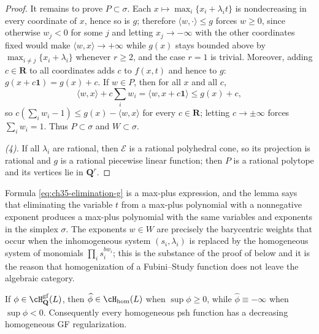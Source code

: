 \begin{proof}
It remains to prove $P\subset\sigma$.  Each $x\mapsto\max_i\{x_i+\lambda_it\}$
is nondecreasing in every coordinate of $x$, hence so is $g$; therefore
$\langle w,\cdot\rangle\leq g$ forces $w\geq0$, since otherwise
$w_j<0$ for some $j$ and letting $x_j\to-\infty$ with the other
coordinates fixed would make $\langle w,x\rangle\to+\infty$ while
$g(x)$ stays bounded above by
$\max_{i\neq j}\{x_i+\lambda_i\}$ whenever $r\geq2$, and the case
$r=1$ is trivial.  Moreover, adding $c\in\mathbf R$ to all coordinates
adds $c$ to $f(x,t)$ and hence to $g$:
$g(x+c\mathbf 1)=g(x)+c$.  If $w\in P$, then for all $x$ and all
$c$,
\[
 \langle w,x\rangle+c\sum_iw_i=\langle w,x+c\mathbf 1\rangle
 \leq g(x)+c ,
\]
so $c(\sum_iw_i-1)\leq g(x)-\langle w,x\rangle$ for every
$c\in\mathbf R$; letting $c\to\pm\infty$ forces $\sum_iw_i=1$.  Thus
$P\subset\sigma$ and $W\subset\sigma$.

\emph{(4).}  If all $\lambda_i$ are rational, then $\mathcal E$ is a
rational polyhedral cone, so its projection is rational and $g$ is a
rational piecewise linear function; then $P$ is a rational polytope and
its vertices lie in $\mathbf Q^r$.
\end{proof}

\begin{remark}
\label{rem:ch35-elimination-tropical}
Formula \eqref{eq:ch35-elimination-g} is a max-plus expression, and the
lemma says that eliminating the variable $t$ from a max-plus polynomial
with a nonnegative exponent produces a max-plus polynomial with the same
variables and exponents in the simplex $\sigma$.  The exponents
$w\in W$ are precisely the barycentric weights that occur when the
inhomogeneous system $(s_i,\lambda_i)$ is replaced by the homogeneous
system of monomials $\prod_is_i^{bw_i}$; this is the substance of the
proof of  below and it is the reason that
homogenization of a Fubini--Study function does not leave the algebraic
category.
\end{remark}

\begin{proposition}\label{prop:homogenization-gf}
If $\phi\in\cH^{\mathrm{gf}}_{\mathbf Q}(L)$, then
$\widehat\phi\in\cH_{\mathrm{hom}}(L)$ when
$\sup\phi\geq0$, while $\widehat\phi\equiv-\infty$ when
$\sup\phi<0$.  Consequently every homogeneous psh function has a
decreasing homogeneous GF regularization.
\end{proposition}

